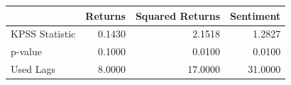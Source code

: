 \begin{table}[htbp]
\centering
\begin{tabular}{lrrr}
\toprule
 & Returns & Squared Returns & Sentiment \\
\midrule
KPSS Statistic & 0.1430 & 2.1518 & 1.2827 \\
p-value & 0.1000 & 0.0100 & 0.0100 \\
Used Lags & 8.0000 & 17.0000 & 31.0000 \\
\bottomrule
\end{tabular}
\label{tab:kpss}
\end{table}
